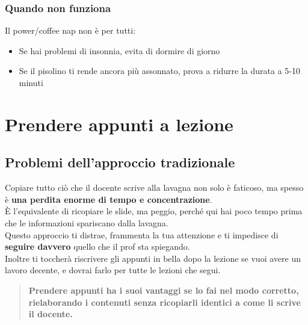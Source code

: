 \documentclass[18pt]{extarticle}
\begin{document}
\subsubsection{Quando non funziona}
Il power/coffee nap non è per tutti:
\begin{itemize}
\item Se hai problemi di insonnia, evita di dormire di giorno
\item Se il pisolino ti rende ancora più assonnato, prova a ridurre la durata a 5-10 minuti
\end{itemize}


\section{Prendere appunti a lezione}
\subsection{Problemi dell'approccio tradizionale}
Copiare tutto ciò che il docente scrive alla lavagna non solo è faticoso, ma spesso è \textbf{una perdita enorme di tempo e concentrazione}.\\
È l'equivalente di ricopiare le slide, ma peggio, perché qui hai poco tempo prima che le informazioni spariscano dalla lavagna.\\
Questo approccio ti distrae, frammenta la tua attenzione e ti impedisce di \textbf{seguire davvero} quello che il prof sta spiegando.\\
Inoltre ti toccherà riscrivere gli appunti in bella dopo la lezione se vuoi avere un lavoro decente, e dovrai farlo per tutte le lezioni che segui.
\begin{quote}
\textbf{Prendere appunti ha i suoi vantaggi se lo fai nel modo corretto, rielaborando i contenuti senza ricopiarli identici a come li scrive il docente.}
\end{quote}
\end{document}
